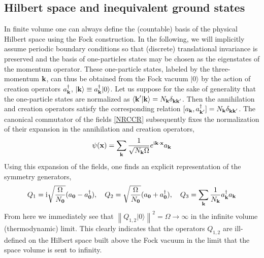 \documentclass[final,3p,times,12pt,a4paper,sort&compress]{elsarticle}
\newcommand\vek[1]{{\boldsymbol{\bf #1}}}   %
\newcommand\skal[2]{\vek{#1}\cdot\vek{#2}}  %
\newcommand\ket[1]{\vert#1\rangle}          %
\newcommand\braket[2]{\langle#1\vert#2\rangle} %
\newcommand\he[1]{#1^{\dagger}}             %
\newcommand\imag{\mathrm i}                 %
\newcommand\nor[1]{\left\|#1\right\|}       %
\begin{document}
\subsection{Hilbert space and inequivalent ground states}
In finite volume one can always define the (countable) basis of the
physical Hilbert space using the Fock construction. In the following, we will
implicitly assume periodic boundary conditions so that (discrete) translational
invariance is preserved and the basis of one-particles states may be chosen as
the eigenstates of the momentum operator. These one-particle states, labeled by
the three-momentum $\vek k$, can thus be obtained from the Fock vacuum $\ket0$
by the action of creation operators $\he a_{\vek k}$, $\ket{\vek k}\equiv\he
a_{\vek k}\ket0$. Let us suppose for the sake of generality that the
one-particle states are normalized as $\braket{\vek k'}{\vek k}=N_{\vek
k}\delta_{\vek k\vek k'}$. Then the annihilation and creation operators satisfy
the corresponding relation $[a_{\vek k},\he a_{\vek k'}]=N_{\vek k}\delta_{\vek
k\vek k'}$. The canonical commutator of the fields \eqref{NRCCR} subsequently
fixes the normalization of their expansion in the annihilation and creation
operators,
\begin{equation}
\psi(\vek x)=\sum_{\vek k}\frac{1}{\sqrt{N_{\vek k}\Omega}}
e^{\imag\skal kx}a_{\vek k}
\end{equation}
Using this expansion of the fields, one finds an explicit representation of the
symmetry generators,
\begin{equation}
Q_1=\imag\sqrt{\frac{\Omega}{N_{\vek 0}}}(a_{\vek 0}-\he a_{\vek 0}),\quad
Q_2=\sqrt{\frac{\Omega}{N_{\vek 0}}}(a_{\vek 0}+\he a_{\vek 0}),\quad
Q_3=\sum_{\vek k}\frac1{N_{\vek k}}\he a_{\vek k}a_{\vek k}
\label{NRgenerators}
\end{equation}
From here we immediately see that $\nor{Q_{1,2}\ket0}^2=\Omega\to\infty$ in
the infinite volume (thermodynamic) limit. This clearly indicates that the
operators $Q_{1,2}$ are ill-defined on the Hilbert space built above the Fock
vacuum in the limit that the space volume is sent to infinity.
\end{document}

